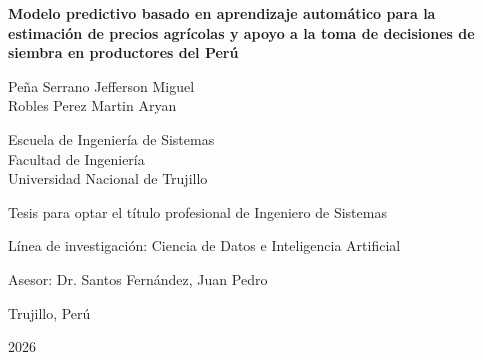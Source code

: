 \documentclass[12pt, a4paper]{report}
\begin{document}

\thispagestyle{fancy}
\begin{center}
  \vspace*{2in}

  \textbf{Modelo predictivo basado en aprendizaje automático para la estimación
  de precios agrícolas y apoyo a la toma de decisiones de siembra en productores
  del Perú}

  \vspace{24pt}

  Peña Serrano Jefferson Miguel\\
  Robles Perez Martin Aryan

  \vspace{12pt}

  Escuela de Ingeniería de Sistemas\\
  Facultad de Ingeniería\\
  Universidad Nacional de Trujillo

  \vspace{12pt}

  Tesis para optar el título profesional de Ingeniero de Sistemas

  \vspace{12pt}

  Línea de investigación: Ciencia de Datos e Inteligencia Artificial

  \vspace{12pt}

  Asesor: Dr. Santos Fernández, Juan Pedro

  \vspace{12pt}

  Trujillo, Perú

  2026
\end{center}

\newpage

\setcounter{page}{1}

{
\singlespacing
\tableofcontents
}
\clearpage

{
\singlespacing
\listoftables
}
\clearpage


\setcounter{page}{1}
\end{document}
